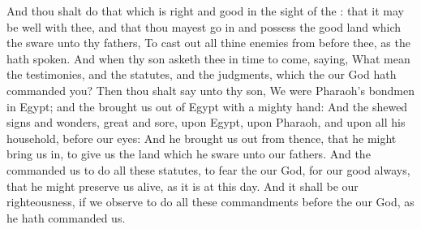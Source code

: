 \begin{biblechapter}
\verse And thou shalt do that which is right and good in the sight of the \LORD: that it may be well with thee, and that thou mayest go in and possess the good land which the \LORD sware unto thy fathers,
\verse To cast out all thine enemies from before thee, as the \LORD hath spoken.
\verse And when thy son asketh thee in time to come, saying, What mean the testimonies, and the statutes, and the judgments, which the \LORD our God hath commanded you?
\verse Then thou shalt say unto thy son, We were Pharaoh's bondmen in Egypt; and the \LORD brought us out of Egypt with a mighty hand:
\verse And the \LORD shewed signs and wonders, great and sore, upon Egypt, upon Pharaoh, and upon all his household, before our eyes:
\verse And he brought us out from thence, that he might bring us in, to give us the land which he sware unto our fathers.
\verse And the \LORD commanded us to do all these statutes, to fear the \LORD our God, for our good always, that he might preserve us alive, as it is at this day.
\verse And it shall be our righteousness, if we observe to do all these commandments before the \LORD our God, as he hath commanded us.
\end{biblechapter}

